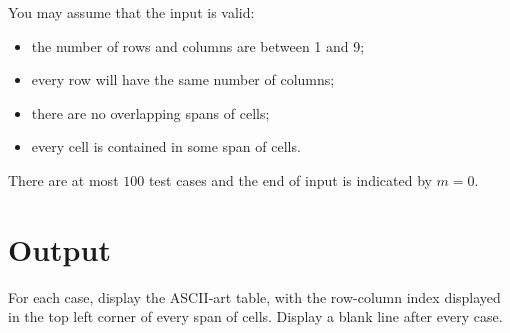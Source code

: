 You may assume that the input is valid:
\begin{itemize}
\item the number of rows and columns are between 1 and 9;
\item every row will have the same number of columns;
\item there are no overlapping spans of cells;
\item every cell is contained in some span of cells.
\end{itemize}

There are at most $100$ test cases and the end of input is indicated by $m
= 0$. 

\section*{Output}

For each case, display the ASCII-art table, with the row-column index
displayed in the top left corner of every span of cells. Display a blank
line after every case.
